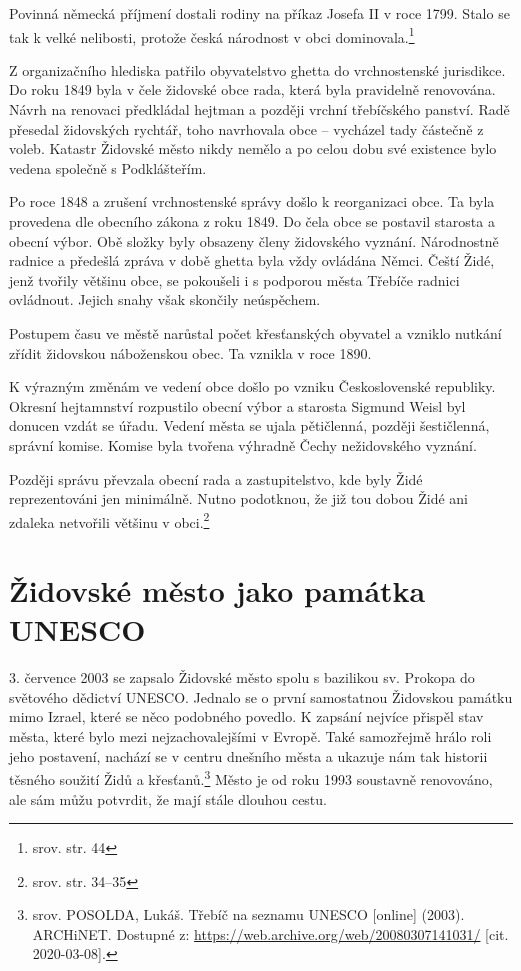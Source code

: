 \documentclass[a4paper,oneside,12pt]{report}
\begin{document}
Povinná německá příjmení dostali rodiny na příkaz Josefa II v roce 1799.
Stalo se tak k velké nelibosti, protože česká národnost v obci dominovala.\footnote{srov. \cite{Uhlir1978} str. 44}

Z organizačního hlediska patřilo obyvatelstvo ghetta do vrchnostenské jurisdikce.
Do roku 1849 byla v čele židovské obce rada, která byla pravidelně renovována.
Návrh na renovaci předkládal hejtman a později vrchní třebíčského panství.
Radě přesedal židovských rychtář, toho navrhovala obce -- vycházel tady částečně z voleb.
Katastr Židovské město nikdy nemělo a po celou dobu své existence bylo vedena společně s Podklášteřím.

Po roce 1848 a zrušení vrchnostenské správy došlo k reorganizaci obce.
Ta byla provedena dle obecního zákona z roku 1849.
Do čela obce se postavil starosta a obecní výbor.
Obě složky byly obsazeny členy židovského vyznání.
Národnostně radnice a předešlá zpráva v době ghetta byla vždy ovládána Němci.
Čeští Židé, jenž tvořily většinu obce, se pokoušeli i s podporou města Třebíče radnici ovládnout.
Jejich snahy však skončily neúspěchem.

Postupem času ve městě narůstal počet křesťanských obyvatel a vzniklo nutkání zřídit židovskou náboženskou obec.
Ta vznikla v roce 1890.

K výrazným změnám ve vedení obce došlo po vzniku Československé republiky.
Okresní hejtamnství rozpustilo obecní výbor a starosta Sigmund Weisl byl donucen vzdát se úřadu.
Vedení města se ujala pětičlenná, později šestičlenná, správní komise.
Komise byla tvořena výhradně Čechy nežidovského vyznání.

Později správu převzala obecní rada a zastupitelstvo, kde byly Židé reprezentováni jen minimálně.
Nutno podotknou, že již tou dobou Židé ani zdaleka netvořili většinu v obci.\footnote{srov. \cite{Svobodva2015} str. 34--35}

\section{Židovské město jako památka UNESCO}

3. července 2003 se zapsalo Židovské město spolu s bazilikou sv. Prokopa do světového dědictví UNESCO.
Jednalo se o první samostatnou Židovskou památku mimo Izrael, které se něco podobného povedlo.
K zapsání nejvíce přispěl stav města, které bylo mezi nejzachovalejšími v Evropě.
Také samozřejmě hrálo roli jeho postavení, nachází se v centru dnešního města a ukazuje nám tak historii těsného soužití Židů a křesťanů.\footnote{srov. POSOLDA, Lukáš. Třebíč na seznamu UNESCO [online] (2003). ARCHiNET. Dostupné z: \url{https://web.archive.org/web/20080307141031/}  [cit. 2020-03-08].}
Město je od roku 1993 soustavně renovováno, ale sám můžu potvrdit, že mají stále dlouhou cestu.
\end{document}
